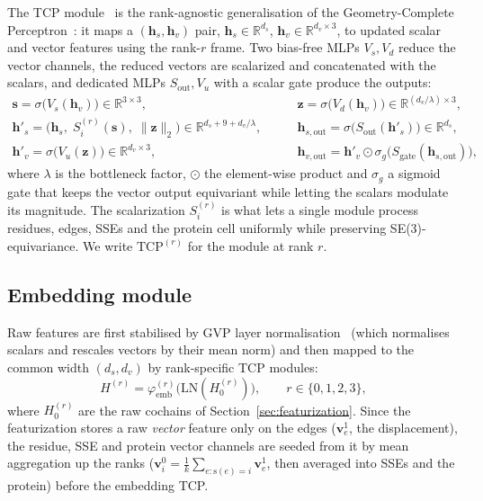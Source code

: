 \documentclass[11pt,a4paper]{article}
\theoremstyle{definition}
\begin{document}
The TCP module~\cite{topotein} is the rank-agnostic generalisation of the
Geometry-Complete Perceptron~\cite{gcpnet}: it maps a $(\mathbf{h}_s,\mathbf{h}_v)$
pair, $\mathbf{h}_s\in\mathbb{R}^{d_s}$, $\mathbf{h}_v\in\mathbb{R}^{d_v\times 3}$,
to updated scalar and vector features using the rank-$r$ frame. Two bias-free MLPs
$V_s,V_d$ reduce the vector channels, the reduced vectors are scalarized and
concatenated with the scalars, and dedicated MLPs $S_{\mathrm{out}},V_u$ with a
scalar gate produce the outputs:
\[
\begin{aligned}
\mathbf{s}=\sigma\big(V_s(\mathbf{h}_v)\big)\in\mathbb{R}^{3\times 3},\qquad
&\mathbf{z}=\sigma\big(V_d(\mathbf{h}_v)\big)\in\mathbb{R}^{(d_v/\lambda)\times 3},\\
\mathbf{h}'_s=\big(\mathbf{h}_s,\;S^{(r)}_i(\mathbf{s}),\;\lVert\mathbf{z}\rVert_2\big)\in\mathbb{R}^{d_s+9+d_v/\lambda},\qquad
&\mathbf{h}_{s,\mathrm{out}}=\sigma\big(S_{\mathrm{out}}(\mathbf{h}'_s)\big)\in\mathbb{R}^{d_s},\\
\mathbf{h}'_v=\sigma\big(V_u(\mathbf{z})\big)\in\mathbb{R}^{d_v\times 3},\qquad
&\mathbf{h}_{v,\mathrm{out}}=\mathbf{h}'_v\odot\sigma_g\big(S_{\mathrm{gate}}(\mathbf{h}_{s,\mathrm{out}})\big),
\end{aligned}
\]
where $\lambda$ is the bottleneck factor, $\odot$ the element-wise product and
$\sigma_g$ a sigmoid gate that keeps the vector output equivariant while letting the
scalars modulate its magnitude. The scalarization $S^{(r)}_i$ is what lets a single
module process residues, edges, SSEs and the protein cell uniformly while preserving
SE(3)-equivariance. We write $\mathrm{TCP}^{(r)}$ for the module at rank $r$.

\subsection{Embedding module}
\label{sec:embed}

Raw features are first stabilised by GVP layer normalisation~\cite{gvp} (which
normalises scalars and rescales vectors by their mean norm) and then mapped to the
common width $(d_s,d_v)$ by rank-specific TCP modules:
\[
H^{(r)}=\varphi^{(r)}_{\mathrm{emb}}\big(\mathrm{LN}(H^{(r)}_0)\big),\qquad r\in\{0,1,2,3\},
\]
where $H^{(r)}_0$ are the raw cochains of Section~\ref{sec:featurization}. Since the
featurization stores a raw \emph{vector} feature only on the edges
($\mathbf{v}^{1}_e$, the displacement), the residue, SSE and protein vector channels
are seeded from it by mean aggregation up the ranks ($\mathbf{v}^{0}_i=\tfrac1k\sum_{e:\mathrm{s}(e)=i}\mathbf{v}^{1}_e$,
then averaged into SSEs and the protein) before the embedding TCP.
\end{document}
